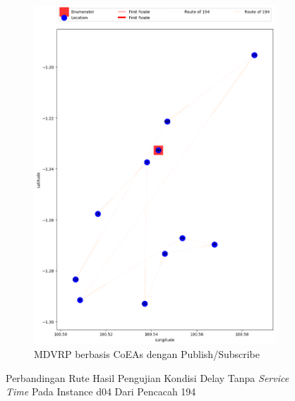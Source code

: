 \begin{figure}[H]\ContinuedFloat
	\centering
	\begin{subfigure}[t]{\textwidth}
		\centering
		\includegraphics[width=\textwidth]{Resources/Images/delayed_4/real_m15_n100_delayed_4_194_pubsub_coes}
		\caption{MDVRP berbasis CoEAs dengan Publish/Subscribe}
		\label{fig:real_m15_n100_delayed_4_194_pubsub_coes}
	\end{subfigure}
	\caption{Perbandingan Rute Hasil Pengujian Kondisi Delay Tanpa \textit{Service Time} Pada Instance d04 Dari Pencacah 194}
	\label{fig:real_m15_n100_delayed_4_194_contd}
\end{figure}


